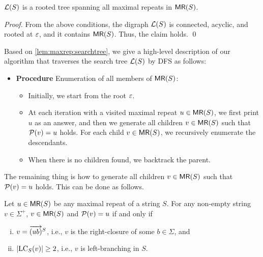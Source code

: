 \begin{lemma}\label{lem:maxrep:searchtree}
  $\mathcal{L}(S)$ is a rooted tree spanning all maximal repeats in $\textsf{MR}(S)$. 
\end{lemma}

\begin{proof}
From the above conditions, the digraph $\mathcal{L}(S)$ is connected, acyclic, and rooted at $\varepsilon$, and it contains $\textsf{MR}(S)$. Thus, the claim holds. 
\qed\end{proof}

Based on \cref{lem:maxrep:searchtree}, we give a high-level description of our algorithm that traverses the search tree $\mathcal{L}(S)$ by DFS as follows:

\begin{definition}\label{lem:maxrep:algo:highlevel}
\begin{itemize}
\item[] \textbf{Procedure}  Enumeration of all members of $\textsf{MR}(S)$: 
\begin{itemize}
\item Initially, we start from the root $\varepsilon$. 
\item At each iteration with a visited maximal repeat $u \in \textsf{MR}(S)$, we first print $u$ as an answer, and then we generate all children $v \in \textsf{MR}(S)$ such that $\mathcal{P}(v) = u$ holds. For each child $v \in \textsf{MR}(S)$, we recursively enumerate the descendants.
\item When there is no children found, we backtrack the parent. 
\end{itemize}
\end{itemize}
\end{definition}

The remaining thing is how to generate all children $v \in \textsf{MR}(S)$ such that $\mathcal{P}(v) = u$ holds.
This can be done as follows. 

\begin{lemma}\label{lem:maxrep:howto:child}
  Let $u \in \textsf{MR}(S)$ be any maximal repeat of a string $S$. For any non-empty string $v \in \Sigma^+$, $v \in \textsf{MR}(S)$ and $\mathcal{P}(v) = u$ if and only if 
  \begin{enumerate}[(i)]
  \item $v = \overrightarrow{(ub)}^{S}$, i.e., $v$ is the right-closure of some $b\in \Sigma$, and 
  \item $|\mathrm{LC}_{S}(v)| \ge 2$, i.e., $v$ is left-branching in $S$. 
  \end{enumerate}
\end{lemma}

